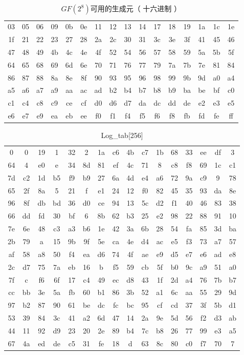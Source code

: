 \begin{table}[htbp]
	\caption{$GF\left(2^8\right)$可用的生成元（ 十六进制 ）}
	\centering
\begin{tabular}{cccccccccccccccc}
	\toprule
 03 & 05&06& 09 &0b& 0e &11& 12 &13 &14& 17& 18 &19 &1a& 1c& 1e \\
 1f &21 &22 &23& 27 &28& 2a &2c &30 &31 &3c &3e& 3f &41& 45& 46 \\
 47& 48& 49& 4b& 4c& 4e& 4f& 52& 54& 56 &57 &58& 59& 5a& 5b& 5f \\
 64 &65& 68& 69& 6d& 6e& 70 &71 &76& 77& 79 &7a &7b& 7e &81 &84 \\
 86& 87 &88& 8a& 8e& 8f& 90& 93 &95& 96 &98& 99& 9b &9d &a0 &a4 \\
 a5& a6& a7 &a9& aa &ac &ad &b2& b4& b7& b8& b9 &ba &be &bf &c0 \\
 c1 &c4& c8& c9& ce &cf& d0& d6 &d7& da& dc &dd& de& e2 &e3& e5 \\
 e6& e7& e9& ea& eb& ee &f0& f1& f4& f5& f6& f8& fb& fd & fe &ff \\
	\bottomrule
\end{tabular}
	\label{GENERATOR}
\end{table}


\begin{table}[htb]
	\caption{Log\_tab[256]}
	\centering
	\begin{tabular}{cccccccccccccccc}
		\toprule
 0&0&19&1&32&2&1a&c6&4b&c7&1b&68&33&ee&df&3\\
64&4&e0&e&34&8d&81&ef&4c&71&8&c8&f8&69&1c&c1\\
7d&c2&1d&b5&f9&b9&27&6a&4d&e4&a6&72&9a&c9&9&78\\
65&2f&8a&5&21&f&e1&24&12&f0&82&45&35&93&da&8e\\
96&8f&db&bd&36&d0&ce&94&13&5c&d2&f1&40&46&83&38\\
66&dd&fd&30&bf&6&8b&62&b3&25&e2&98&22&88&91&10\\
7e&6e&48&c3&a3&b6&1e&42&3a&6b&28&54&fa&85&3d&ba\\
2b&79&a&15&9b&9f&5e&ca&4e&d4&ac&e5&f3&73&a7&57\\
af&58&a8&50&f4&ea&d6&74&4f&ae&e9&d5&e7&e6&ad&e8\\
2c&d7&75&7a&eb&16&b&f5&59&cb&5f&b0&9c&a9&51&a0\\
7f&c&f6&6f&17&c4&49&ec&d8&43&1f&2d&a4&76&7b&b7\\
cc&bb&3e&5a&fb&60&b1&86&3b&52&a1&6c&aa&55&29&9d\\
97&b2&87&90&61&be&dc&fc&bc&95&cf&cd&37&3f&5b&d1\\
53&39&84&3c&41&a2&6d&47&14&2a&9e&5d&56&f2&d3&ab\\
44&11&92&d9&23&20&2e&89&b4&7c&b8&26&77&99&e3&a5\\
67&4a&ed&de&c5&31&fe&18&d&63&8c&80&c0&f7&70&7\\
		\bottomrule
	\end{tabular}
	\label{Logtab}
\end{table}


